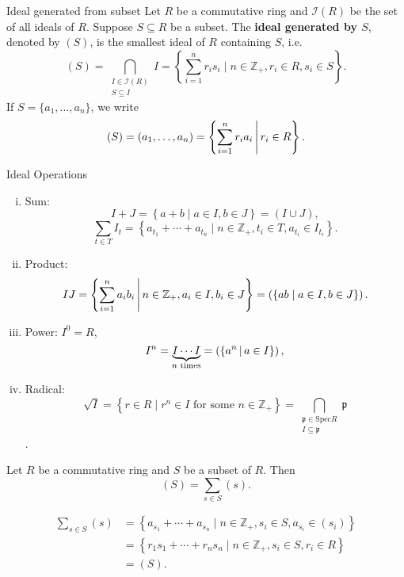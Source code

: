 \begin{definition}{Ideal generated from subset}{}
    Let $R$ be a commutative ring and $\mathcal I(R)$ be the set of all ideals of $R$. Suppose $S\subseteq R$ be a subset. The \textbf{ideal generated by $S$}, denoted by $(S)$, is the smallest ideal of $R$ containing $S$, i.e. 
    \[
        (S)=\bigcap_{\substack{ I\in \mathcal I(R)\\S\subseteq I}}I=\left\{\sum_{i=1}^n r_is_i\mid n\in\mathbb{Z}_{+},r_i\in R,s_i\in S\right\}.
    \]
    If $S=\{a_1,\dots,a_n\}$, we write 
    \[
        (S)=(a_1,\dots,a_n)=\left\{\sum_{i=1}^n r_ia_i\,\middle\vert\,  r_i\in R\right\}.
    \]
\end{definition}

\begin{definition}{Ideal Operations}{}
    \begin{enumerate}[(i)]
        \item Sum: $$I+J=\left\{a+b\mid a\in I,b\in J\right\}=\left(I\cup J\right),$$
        $$
        \sum_{t \in T} I_t=\left\{a_{t_1}+ \cdots +a_{t_n}\mid n\in\mathbb{Z}_{+},t_i\in T,a_{t_i}\in I_{t_i}\right\}.
        $$
        \item Product: $$IJ=\left\{\sum_{i=1}^n a_ib_i\,\middle\vert\, n\in\mathbb{Z}_{+},a_i\in I,b_i\in J\right\}=\left(\{ab\mid a\in I,b\in J\}\right).$$
        \item Power: $I^0=R$,
        \[
            I^n=\underbrace{I\cdots I}_{n\text{ times}}=\left(\{a^n\,\middle\vert\, a\in I\}\right), 
            \]
        \item Radical: \[
            \sqrt{I} = \left\{ r \in R \mid r^n \in I \text{ for some } n \in \mathbb{Z}_{+} \right\} = \bigcap_{\substack{\mathfrak{p} \in \mathrm{Spec} R \\ I \subseteq \mathfrak{p}}} \mathfrak{p}
            \].
    \end{enumerate}
\end{definition}

\begin{proposition}{}{}
    Let $R$ be a commutative ring and $S$ be a subset of $R$. Then 
    $$(S)=\sum_{s\in S}(s).$$
\end{proposition}

\begin{prf}
    \begin{align*}
        \sum_{s \in S} (s)&=\left\{a_{s_1}+ \cdots +a_{s_n}\mid n\in\mathbb{Z}_{+},s_i\in S,a_{s_i}\in (s_i)\right\}\\
        &=\left\{r_1s_{1}+ \cdots +r_ns_{n}\mid n\in\mathbb{Z}_{+},s_i\in S,r_i\in R\right\}\\
        &=(S).
    \end{align*}
\end{prf}


